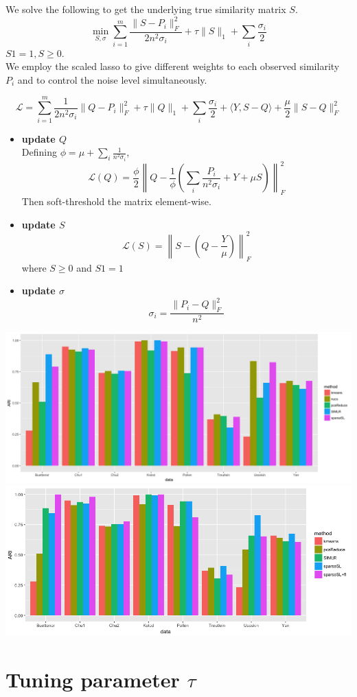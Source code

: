 \documentclass[11pt]{article}
\newcommand{\norm}[1]{\left\lVert#1\right\rVert}
\begin{document}
We solve the following to get the underlying true similarity matrix $S$.
$$\min_{S,\sigma} \sum_{i=1}^{m} \frac{\|S-P_i\|_F^2}{2n^2 \sigma_i} + \tau \|S\|_1 + \sum_i \frac{\sigma_i}{2}$$
$S1 = 1, S\geq 0$.\\ 
We employ the scaled lasso to give different weights to each observed similarity $P_i$ and to control the noise level simultaneously. 

$$\mathcal{L} = \sum_{i=1}^{m} \frac{1}{2n^2 \sigma_i} \|Q-P_i\|_F^2 + \tau \|Q\|_1 + \sum_i \frac{\sigma_i}{2} + \langle Y, S-Q \rangle + \frac{\mu}{2} \|S-Q\|_F^2$$
\begin{itemize}
\item \textbf{update $Q$}\\
Defining $\phi = \mu + \sum_i \frac{1}{n^2 \sigma_i}$,
$$\mathcal{L}(Q) = \frac{\phi}{2} \norm{Q - \frac{1}{\phi} \left( \sum_i \frac{P_i}{n^2 \sigma_i} + Y + \mu S\right) }_F^2$$
Then soft-threshold the matrix element-wise.
\item \textbf{update $S$}
$$\mathcal{L}(S) = \norm{S-\left(Q-\frac{Y}{\mu}\right)}_F^2$$
where  $S\geq 0$ and $S1=1$
\item \textbf{update $\sigma$}
$$\sigma_i = \frac{\|P_i - Q\|_F^2}{n^2}$$
\end{itemize}
\noindent
\includegraphics[width=0.98\linewidth]{results_2ndround.png}\\
\noindent
\includegraphics[width=0.98\linewidth]{fusedlassoresult.png}
\section*{Tuning parameter $\tau$}
\end{document}
